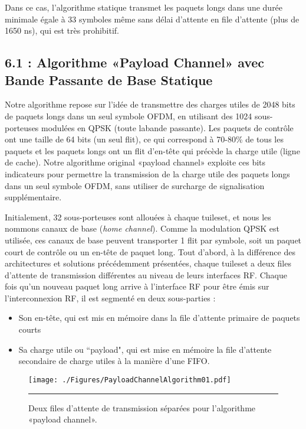 Dans ce cas, l'algorithme statique transmet les paquets longs dans une durée minimale égale à 33 symboles même sans délai d'attente en file d'attente (plus de 1650 ns), qui est très prohibitif.



\subsection*{6.1 : Algorithme «Payload Channel» avec Bande Passante de Base Statique}

Notre algorithme repose sur l'idée de transmettre des charges utiles de 2048 bits de paquets longs dans un seul symbole OFDM, en utilisant des 1024 sous-porteuses modulées en QPSK (toute labande passante). Les paquets de contrôle ont une taille de 64 bits (un seul flit), ce qui correspond à 70-80\% de tous les paquets et les paquets longs ont un flit d’en-tête qui précède la charge utile (ligne de cache). Notre algorithme original «payload channel» exploite ces bits indicateurs pour permettre la transmission de la charge utile des paquets longs dans un seul symbole OFDM, sans utiliser de surcharge de signalisation supplémentaire. 

Initialement, 32 sous-porteuses sont allouées à chaque tuileset, et nous les nommons canaux de base (\textit{home channel}). Comme la modulation QPSK est utilisée, ces canaux de base peuvent transporter 1 flit par symbole, soit un paquet court de contrôle ou un en-tête de paquet long. Tout d'abord, à la différence des architectures et solutions précédemment présentées, chaque tuileset a deux files d'attente de transmission différentes au niveau de leurs interfaces RF. Chaque fois qu'un nouveau paquet long arrive à l'interface RF pour être émis sur l’interconnexion RF, il est segmenté en deux sous-parties : 

\begin{itemize}
  \item Son en-tête, qui est mis en mémoire dans la file d'attente primaire de paquets courts
  \item Sa charge utile ou ``payload", qui est mise en mémoire la file d'attente secondaire de charge utiles à la manière d'une FIFO. 
\end{itemize}

\begin{figure}[htbp]
  \centering
    \texttt{[image: ./Figures/PayloadChannelAlgorithm01.pdf]}
    \rule{35em}{0.5pt}
  \caption[Deux files d'attente de transmission séparées pour l'algorithme de canal de charge utile.]{Deux files d'attente de transmission séparées pour l'algorithme «payload channel».}
  \label{fig:Electron}
\end{figure}

